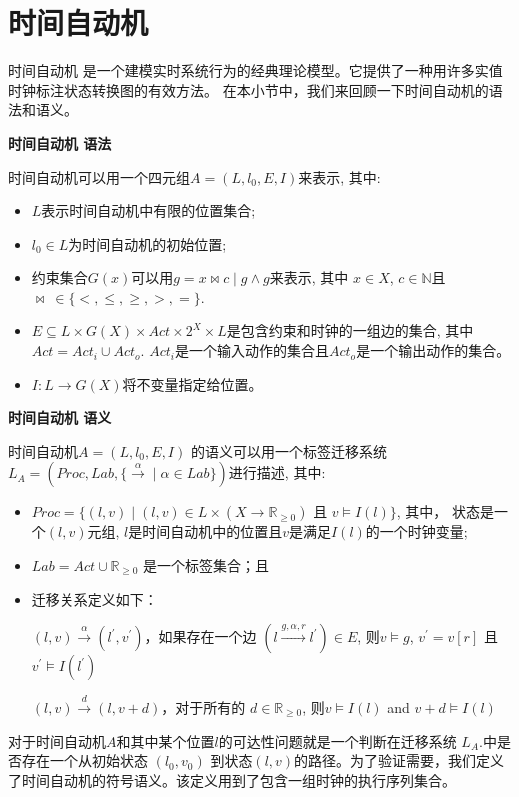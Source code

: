 \section{时间自动机}
时间自动机 \cite{BehrmannDLHPYH06}是一个建模实时系统行为的经典理论模型。它提供了一种用许多实值时钟标注状态转换图的有效方法。 在本小节中，我们来回顾一下时间自动机的语法和语义。
\begin{define}
\textbf{时间自动机 语法}

时间自动机可以用一个四元组$\textit{A}=(L,l_{0},E,I)$来表示, 其中:
\end{define}
\begin{itemize}
\item
$L$表示时间自动机中有限的位置集合;
\item
$l_{0} \in  L$为时间自动机的初始位置;
\item
约束集合$G(x)$可以用$g = x \bowtie c \mid g \land g$来表示, 其中 $x \in X$, $c \in \mathbb{N}$且$\bowtie~\in \{<,\leqslant,\geqslant,>,=\}$. 
\item
$E \subseteq L \times G(X) \times Act \times 2^X \times L$是包含约束和时钟的一组边的集合, 其中 $Act = Act_{i} \cup Act_{o}$. $Act_{i}$是一个输入动作的集合且$Act_{o}$是一个输出动作的集合。
\item
$I : L \rightarrow G(X)$将不变量指定给位置。
\end{itemize}
\begin{define}
\textbf{时间自动机 语义} 

时间自动机$\textit{A}=(L,l_{0},E,I)$ 的语义可以用一个标签迁移系统$L_{\textit{A}} = (Proc,Lab,\lbrace {{\xrightarrow{\alpha}}} \mid \alpha \in Lab \rbrace)$进行描述, 其中:
\end{define}
\begin{itemize}
\item 
$Proc = \lbrace(l,v) \mid (l,v) \in L \times (X \rightarrow \mathbb{R}_{\geqslant{0}})$ 且 $v \models I(l) \rbrace$, 其中， 状态是一个$(l,v)$元组, $l$是时间自动机中的位置且$v$是满足$I(l)$的一个时钟变量;
\item
$Lab = Act \cup \mathbb{R}_{\geqslant{0}}$ 是一个标签集合；且 
\item
迁移关系定义如下：

$(l,v) \xrightarrow{\alpha} (l^{\prime},v^{\prime})$，如果存在一个边 $(l \xrightarrow{g,\alpha,r} l^{\prime}) \in E$, 则$v \models g$, $v^{\prime} = v[r]$ 且 $v^{\prime} \models I(l^{\prime})$

$(l,v) \xrightarrow{d} (l,v+d)$，对于所有的 $d \in  \mathbb{R}_{\geqslant{0}}$, 则$v \models I(l)$ and $v + d \models I(l)$
\end{itemize}
对于时间自动机$A$和其中某个位置$l$的可达性问题就是一个判断在迁移系统 $L_{A}$.中是否存在一个从初始状态 $(l_{0},v_{0})$ 到状态$(l,v)$的路径。为了验证需要，我们定义了时间自动机的符号语义。该定义用到了包含一组时钟的执行序列集合。

